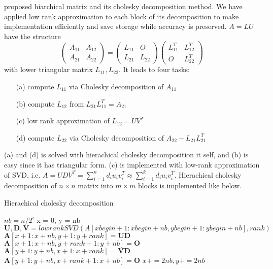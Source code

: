 \citet{hackbusch2015hierarchical} proposed hiarchical matrix and its cholesky decomposition method. We have applied low rank approximation to each block of its decomposition to make implementation efficiently and save storage while accuracy is preserved.
$A=LU$have the structure
$$\begin{pmatrix}A_{11}&A_{12}\\A_{21}&A_{22}\end{pmatrix}=\begin{pmatrix}L_{11}&O\\L_{21}&L_{22}\end{pmatrix}\begin{pmatrix}L_{11}^T&L_{12}^T\\O&L_{22}^T\end{pmatrix}$$
with lower triangular matrix $L_{11},L_{22}$.
It leads to four tasks:
\begin{itemize}
	\item[(a)] compute $L_{11}$ via Cholesky decomposition of $A_{11}$
	\item[(b)] compute $L_{12}$ from $L_{21}L_{11}^T = A_{21}$
	\item[(c)] low rank approximation of $L_{12}=UV^T$
	\item[(d)] compute $L_{22}$ via Cholesky decomposition of $A_{22}-L_{21}L_{21}^T$
\end{itemize}
(a) and (d) is solved with hierachical cholesky decomposition it self, and (b) is easy since it has triangular form. (c) is implemented with low-rank approximation of SVD, i.e. $A=UDV^T=\sum_{i=1}^n d_i u_iv_i^T\approx\sum_{i=1}^k d_i u_iv_i^T$.
Hierachical cholesky decomposition of $n\times n$ matrix into $m\times m$ blocks is implemented like below.
\begin{algorithm}[ht]
	\caption{Hierachical cholesky decomposition}
	\begin{algorithmic}[1]
		\State $nb = n/2^i$
		\State x = 0, y = nb
		\State $\mathbf{U,D,V} = lowrankSVD(A[xbegin+1:xbegin+nb,ybegin+1:ybegin+nb], rank)$
		\State $\mathbf{A}[x + 1:x + nb, y + 1:y + rank] = \mathbf{UD}$
		\State $\mathbf{A}[x + 1:x + nb, y + rank+1:y + nb] = \mathbf{O}$
		\State $\mathbf{A}[y + 1:y + nb, x + 1:x + rank] = \mathbf{VD}$
		\State $\mathbf{A}[y + 1:y + nb, x + rank+1:x + nb] = \mathbf{O}$
		\State $x += 2nb, y += 2nb$
		\EndFor
		\EndFor
		\EndProcedure
		
	\end{algorithmic}\label{alg:hchol}
\end{algorithm}


